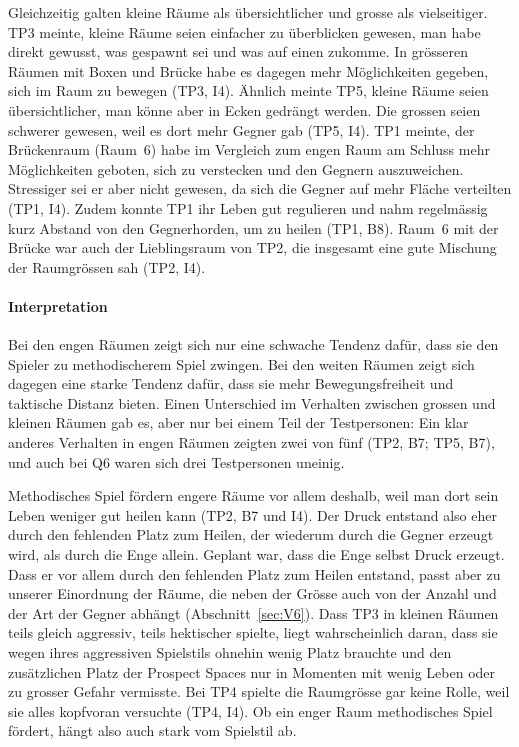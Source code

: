 \documentclass[../Main.tex]{subfiles}
\begin{document}
Gleichzeitig galten kleine Räume als übersichtlicher und grosse als vielseitiger. TP3 meinte, kleine Räume seien einfacher zu überblicken gewesen, man habe direkt gewusst, was gespawnt sei und was auf einen zukomme. In grösseren Räumen mit Boxen und Brücke habe es dagegen mehr Möglichkeiten gegeben, sich im Raum zu bewegen (TP3, I4). Ähnlich meinte TP5, kleine Räume seien übersichtlicher, man könne aber in Ecken gedrängt werden. Die grossen seien schwerer gewesen, weil es dort mehr Gegner gab (TP5, I4). TP1 meinte, der Brückenraum (Raum~6) habe im Vergleich zum engen Raum am Schluss mehr Möglichkeiten geboten, sich zu verstecken und den Gegnern auszuweichen. Stressiger sei er aber nicht gewesen, da sich die Gegner auf mehr Fläche verteilten (TP1, I4). Zudem konnte TP1 ihr Leben gut regulieren und nahm regelmässig kurz Abstand von den Gegnerhorden, um zu heilen (TP1, B8). Raum~6 mit der Brücke war auch der Lieblingsraum von TP2, die insgesamt eine gute Mischung der Raumgrössen sah (TP2, I4).

\paragraph{Interpretation}
Bei den engen Räumen zeigt sich nur eine schwache Tendenz dafür, dass sie den Spieler zu methodischerem Spiel zwingen. Bei den weiten Räumen zeigt sich dagegen eine starke Tendenz dafür, dass sie mehr Bewegungsfreiheit und taktische Distanz bieten. Einen Unterschied im Verhalten zwischen grossen und kleinen Räumen gab es, aber nur bei einem Teil der Testpersonen: Ein klar anderes Verhalten in engen Räumen zeigten zwei von fünf (TP2, B7; TP5, B7), und auch bei Q6 waren sich drei Testpersonen uneinig.

Methodisches Spiel fördern engere Räume vor allem deshalb, weil man dort sein Leben weniger gut heilen kann (TP2, B7 und I4). Der Druck entstand also eher durch den fehlenden Platz zum Heilen, der wiederum durch die Gegner erzeugt wird, als durch die Enge allein. Geplant war, dass die Enge selbst Druck erzeugt. Dass er vor allem durch den fehlenden Platz zum Heilen entstand, passt aber zu unserer Einordnung der Räume, die neben der Grösse auch von der Anzahl und der Art der Gegner abhängt (Abschnitt~\ref{sec:V6}). Dass TP3 in kleinen Räumen teils gleich aggressiv, teils hektischer spielte, liegt wahrscheinlich daran, dass sie wegen ihres aggressiven Spielstils ohnehin wenig Platz brauchte und den zusätzlichen Platz der Prospect Spaces nur in Momenten mit wenig Leben oder zu grosser Gefahr vermisste. Bei TP4 spielte die Raumgrösse gar keine Rolle, weil sie alles kopfvoran versuchte (TP4, I4). Ob ein enger Raum methodisches Spiel fördert, hängt also auch stark vom Spielstil ab.
\end{document}
